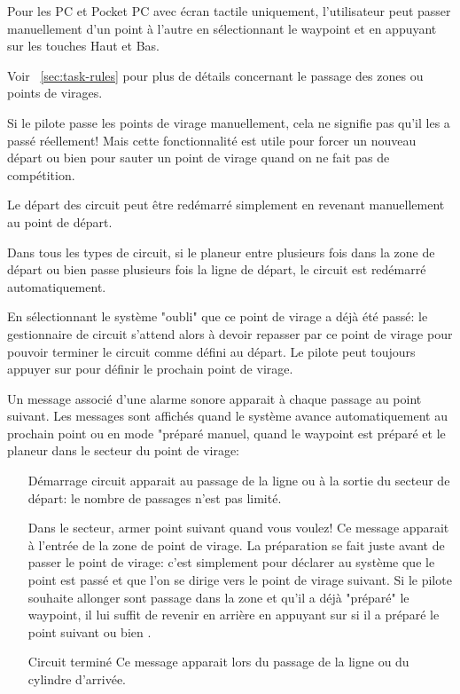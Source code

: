 Pour les PC et Pocket PC avec écran tactile uniquement, l'utilisateur peut passer manuellement d'un point à l'autre en sélectionnant le waypoint {\InfoBox}  et en appuyant sur les touches Haut et Bas.

Voir ~\ref{sec:task-rules} pour plus de détails concernant le passage des zones ou points de virages.

Si le pilote passe les points de virage manuellement, cela ne signifie pas qu'il les a passé réellement! Mais cette fonctionnalité est utile pour forcer un nouveau départ ou bien pour sauter un point de virage quand on ne fait pas de compétition.

\tip Le départ des circuit peut être redémarré simplement en revenant manuellement au point de départ.

Dans tous les types de circuit, si le planeur entre plusieurs fois dans la zone de départ ou bien passe plusieurs fois la ligne de départ, le circuit est redémarré automatiquement.

En sélectionnant  le système "oubli" que ce point de virage a déjà été passé: le gestionnaire de circuit s'attend alors à devoir repasser par ce point de virage pour pouvoir terminer le circuit comme défini au départ. Le pilote peut toujours appuyer sur  pour définir le prochain point de virage.

Un message associé d'une alarme sonore apparait à chaque passage au point suivant. Les messages sont affichés quand le système avance automatiquement au prochain point  ou en mode "préparé manuel, quand le waypoint est préparé et le planeur dans le secteur du point de virage:
\begin{itemize}
\item[Démarrage circuit]  apparait au passage de la ligne ou à la sortie du secteur de départ: le nombre de passages n'est pas limité.
\item[Dans le secteur,]  armer point suivant quand vous voulez! Ce message apparait à l'entrée de la zone de point de virage. La préparation se fait juste avant de passer le point de virage: c'est simplement pour déclarer au système que le point est passé et que l'on se dirige vers le point de virage suivant. Si le pilote souhaite allonger sont passage dans la zone et qu'il a déjà "préparé" le waypoint, il lui suffit de revenir en arrière en appuyant sur  si il a préparé le point suivant ou bien .
\item[Circuit terminé]  Ce message apparait lors du passage de la ligne ou du cylindre d'arrivée.
\end{itemize}

